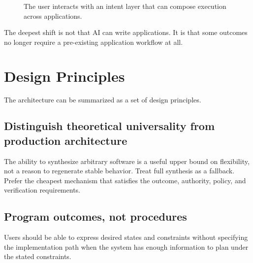 \documentclass[10pt,oneside,openany]{book}
\newcommand{\keyidea}[1]{%
  \vspace{3pt}
  \noindent\fbox{\begin{minipage}{0.94\linewidth}\small\raggedright\textbf{Key idea.} #1\end{minipage}}
  \vspace{3pt}
}
\renewcommand{\keyidea}[1]{\begin{keyideabox}#1\end{keyideabox}}
\begin{document}
\begin{figure}[ht]
\centering
{}
\caption{The user interacts with an intent layer that can compose execution across applications.}
\end{figure}

\keyidea{The deepest shift is not that AI can write applications. It is that some outcomes no longer require a pre-existing application workflow at all.}

\chapter{Design Principles}

The architecture can be summarized as a set of design principles.

\section{Distinguish theoretical universality from production architecture}
The ability to synthesize arbitrary software is a useful upper bound on flexibility, not a reason to regenerate stable behavior. Treat full synthesis as a fallback. Prefer the cheapest mechanism that satisfies the outcome, authority, policy, and verification requirements.

\section{Program outcomes, not procedures}
Users should be able to express desired states and constraints without specifying the implementation path when the system has enough information to plan under the stated constraints.
\end{document}
